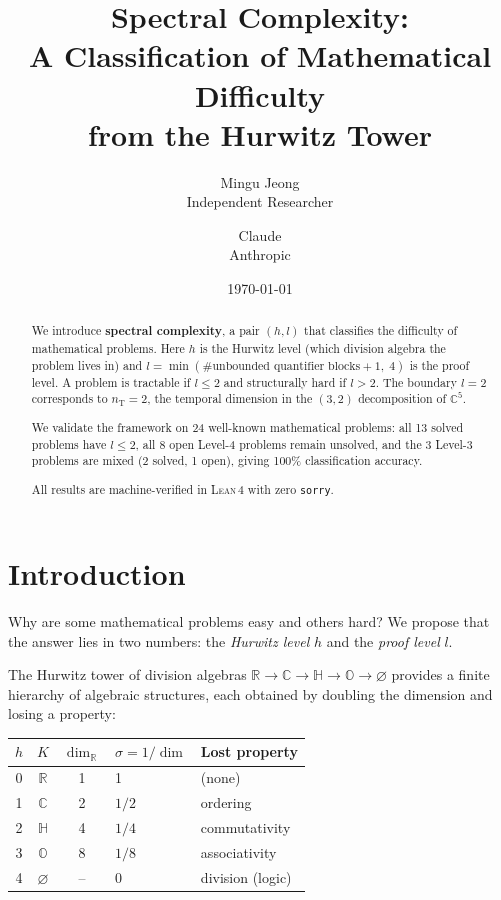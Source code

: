 \documentclass[12pt]{article}
\title{Spectral Complexity:\\
  A Classification of Mathematical Difficulty\\
  from the Hurwitz Tower}
\author{Mingu Jeong\\Independent Researcher
\and Claude\\Anthropic}
\date{\today}
\theoremstyle{remark}
\newcommand{\CC}{\mathbb{C}}
\newcommand{\RR}{\mathbb{R}}
\newcommand{\HH}{\mathbb{H}}
\newcommand{\OO}{\mathbb{O}}
\newcommand{\nT}{n_{\mathrm{T}}}
\newcommand{\Lean}{\textsc{Lean\,4}}
\begin{document}
\maketitle

\begin{abstract}
We introduce \textbf{spectral complexity}, a pair $(h, l)$
that classifies the difficulty of mathematical problems.
Here $h$ is the Hurwitz level (which division algebra
the problem lives in) and $l = \min(\text{\# unbounded
quantifier blocks} + 1,\; 4)$ is the proof level.
A problem is tractable if $l \le 2$ and structurally hard
if $l > 2$. The boundary $l = 2$ corresponds to $\nT = 2$,
the temporal dimension in the $(3,2)$ decomposition of
$\CC^5$.

We validate the framework on 24 well-known mathematical
problems: all 13 solved problems have $l \le 2$, all 8
open Level-4 problems remain unsolved, and the 3 Level-3
problems are mixed (2 solved, 1 open), giving 100\%
classification accuracy.

All results are machine-verified in \Lean{} with zero
\texttt{sorry}.
\end{abstract}

\tableofcontents

\section{Introduction}

Why are some mathematical problems easy and others hard?
We propose that the answer lies in two numbers: the
\emph{Hurwitz level} $h$ and the \emph{proof level} $l$.

The Hurwitz tower of division algebras
$\RR \to \CC \to \HH \to \OO \to \varnothing$
provides a finite hierarchy of algebraic structures, each
obtained by doubling the dimension and losing a property:

\begin{center}
\begin{tabular}{cccll}
\toprule
$h$ & $K$ & $\dim_\RR$ & $\sigma = 1/\dim$ & Lost property \\
\midrule
0 & $\RR$ & 1 & 1 & (none) \\
1 & $\CC$ & 2 & $1/2$ & ordering \\
2 & $\HH$ & 4 & $1/4$ & commutativity \\
3 & $\OO$ & 8 & $1/8$ & associativity \\
4 & $\varnothing$ & -- & 0 & division (logic) \\
\bottomrule
\end{tabular}
\end{center}
\end{document}
